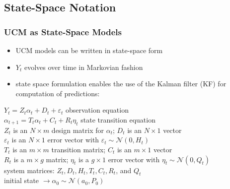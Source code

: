 \documentclass{beamer}
\begin{document}
\subsection{State-Space Notation}
\begin{frame}[t]\frametitle{UCM as State-Space Models}
\begin{itemize}
\item UCM models can be written in state-space form
\item $Y_{t}$ evolves over time in Markovian fashion
\item state space formulation enables the use of the Kalman filter (KF) for computation of predictions:
\end{itemize}
\bigskip
\hspace{30pt} $Y_{t} = Z_{t}\alpha_{t} + D_{t} + \varepsilon_{t}$ \hspace{50pt} observation equation \\
\hspace{30pt} $\alpha_{t+1} = T_{t}\alpha_{t} + C_{t} + R_{t}\eta_{t}$ \hspace{30pt} state transition equation \\
\bigskip
\hspace{15pt} $Z_{t}$ is an $N \times m$ design matrix for $\alpha_{t}$; $D_{t}$ is an $N \times 1$ vector  \\
\hspace{15pt} $\varepsilon_{t}$ is an $N \times 1$ error vector with $\varepsilon_{t} \sim \mathcal{N}(0,H_{t})$ \\
\smallskip
\hspace{15pt} $T_{t}$ is an $m \times m$ transition matrix; $C_{t}$ is an $m \times 1$ vector \\
\hspace{15pt} $R_{t}$ is a $m \times g$ matrix; $\eta_{t}$ is a $g \times 1$ error vector with $\eta_{t} \sim \mathcal{N}(0,Q_{t})$\\
\smallskip
\hspace{15pt} system matrices: $Z_{t},D_{t}, H_{t},T_{t},C_{t},R_{t}$, and $Q_{t}$ \\
\smallskip
\hspace{15pt} initial state $\rightarrow \alpha_{0} \sim \mathcal{N}(a_{0},P_{0})$ \\
\end{frame}
\end{document}
